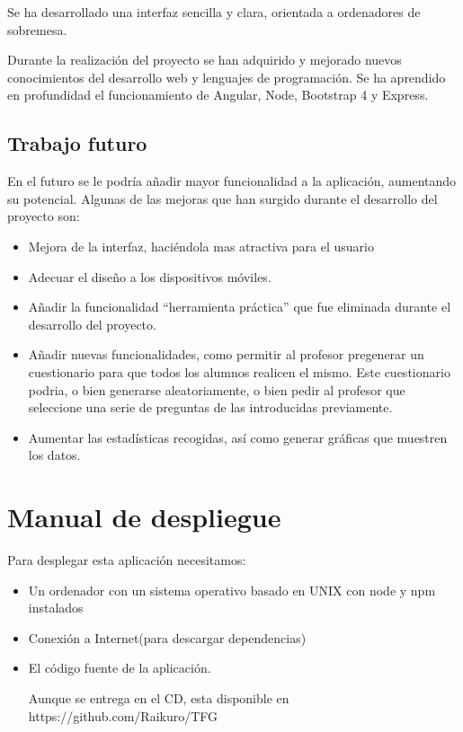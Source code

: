 \documentclass[openright,twoside,10pt]{book}
\providecommand{\tightlist}{%
  \setlength{\itemsep}{0pt}\setlength{\parskip}{0pt}}
\begin{document}
    Se ha desarrollado una interfaz sencilla y clara, orientada a
    ordenadores de sobremesa.
    
    Durante la realización del proyecto se han adquirido y mejorado nuevos
    conocimientos del desarrollo web y lenguajes de programación. Se ha
    aprendido en profundidad el funcionamiento de Angular, Node, Bootstrap 4
    y Express.
    
    \section{Trabajo futuro}\label{trabajo-futuro}
    
    En el futuro se le podría añadir mayor funcionalidad a la aplicación,
    aumentando su potencial. Algunas de las mejoras que han surgido durante
    el desarrollo del proyecto son:
    
    \begin{itemize}
    \tightlist
    \item
      Mejora de la interfaz, haciéndola mas atractiva para el usuario
    \item
      Adecuar el diseño a los dispositivos móviles.
    \item
      Añadir la funcionalidad \enquote{herramienta práctica} que fue
      eliminada durante el desarrollo del proyecto.
    \item
      Añadir nuevas funcionalidades, como permitir al profesor pregenerar un
      cuestionario para que todos los alumnos realicen el mismo. Este
      cuestionario podria, o bien generarse aleatoriamente, o bien pedir al
      profesor que seleccione una serie de preguntas de las introducidas
      previamente.
    \item
      Aumentar las estadísticas recogidas, así como generar gráficas que
      muestren los datos.
    \end{itemize}
    
    \appendix
    
    \chapter{ Manual de despliegue }
    
    Para desplegar esta aplicación necesitamos:
    
    \begin{itemize}
    \item
      Un ordenador con un sistema operativo basado en UNIX con node y npm
      instalados
    \item
      Conexión a Internet(para descargar dependencias)
    \item
      El código fuente de la aplicación.
    
      Aunque se entrega en el CD, esta disponible en
      https://github.com/Raikuro/TFG
    \end{itemize}
    
\end{document}
